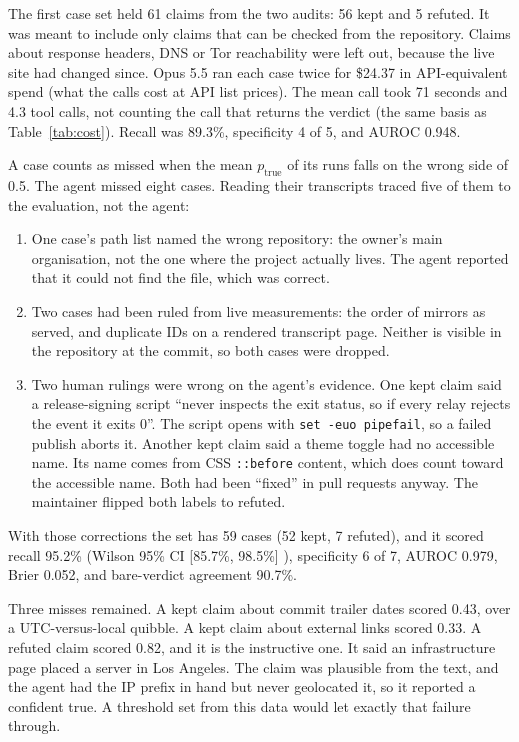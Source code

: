 \documentclass[11pt]{article}
\begin{document}
The first case set held 61 claims from the two audits: 56 kept and 5 refuted. It was meant to include only claims that can be checked from the repository. Claims about response headers, DNS or Tor reachability were left out, because the live site had changed since. Opus 5.5 ran each case twice for \$24.37 in API-equivalent spend (what the calls cost at API list prices). The mean call took 71 seconds and 4.3 tool calls, not counting the call that returns the verdict (the same basis as Table~\ref{tab:cost}). Recall was 89.3\%, specificity 4 of 5, and AUROC 0.948.

A case counts as missed when the mean $p_{\text{true}}$ of its runs falls on the wrong side of 0.5. The agent missed eight cases. Reading their transcripts traced five of them to the evaluation, not the agent:

\begin{enumerate}
  \item One case's path list named the wrong repository: the owner's main organisation, not the one where the project actually lives. The agent reported that it could not find the file, which was correct.
  \item Two cases had been ruled from live measurements: the order of mirrors as served, and duplicate IDs on a rendered transcript page. Neither is visible in the repository at the commit, so both cases were dropped.
  \item Two human rulings were wrong on the agent's evidence. One kept claim said a release-signing script ``never inspects the exit status, so if every relay rejects the event it exits 0''. The script opens with \texttt{set -euo pipefail}, so a failed publish aborts it. Another kept claim said a theme toggle had no accessible name. Its name comes from CSS \texttt{::before} content, which does count toward the accessible name. Both had been ``fixed'' in pull requests anyway. The maintainer flipped both labels to refuted.
\end{enumerate}

With those corrections the set has 59 cases (52 kept, 7 refuted), and it scored recall 95.2\% (Wilson 95\% CI [85.7\%, 98.5\%] \citep{wilson1927}), specificity 6 of 7, AUROC 0.979, Brier 0.052, and bare-verdict agreement 90.7\%.

Three misses remained. A kept claim about commit trailer dates scored 0.43, over a UTC-versus-local quibble. A kept claim about external links scored 0.33. A refuted claim scored 0.82, and it is the instructive one. It said an infrastructure page placed a server in Los Angeles. The claim was plausible from the text, and the agent had the IP prefix in hand but never geolocated it, so it reported a confident true. A threshold set from this data would let exactly that failure through.
\end{document}
